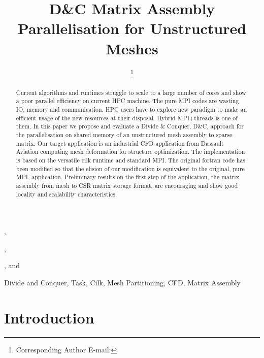 \documentclass{IOS-Book-Article}
\begin{document}
\begin{frontmatter}              %

\title{D\&C Matrix Assembly Parallelisation for Unstructured Meshes}

\author[A]{ %
\thanks{Corresponding Author E-mail: }},
\author[A]{ },
\author[B]{ },
and
\author[C]{ }

\address[A]{PRISM - University of Versailles, France}
\address[B]{Somwhere}
\address[C]{Dassault Aviation, Saint-Cloud, France}

\begin{abstract}
Current algorithms and runtimes struggle to scale to a large number of cores and show a poor parallel efficiency on current HPC machine. The pure MPI codes are wasting IO, memory and communication. HPC users have to explore new paradigm to make an efficient usage of the new resources at their disposal. Hybrid MPI+threads is one of them. In this paper we propose and evaluate a Divide \& Conquer, D\&C, approach for the parallelisation on shared memory of an unstructured mesh assembly to sparse matrix.
Our target application is an industrial CFD application from Dassault Aviation computing mesh deformation for structure optimization. The implementation is based on the versatile cilk runtime and standard MPI. The original fortran code has been modified so that the elision of our modification is equivalent to the original, pure MPI, application.
Preliminary results on the first step of the application, the matrix assembly from mesh to CSR matrix storage format, are encouraging and show good locality and scalability characteristics.

\end{abstract}

\begin{keyword}
Divide and Conquer, Task, Cilk, Mesh Partitioning, CFD, Matrix Assembly 
\end{keyword}
\end{frontmatter}

\thispagestyle{empty}
\pagestyle{empty}

\section*{Introduction}
\end{document}

